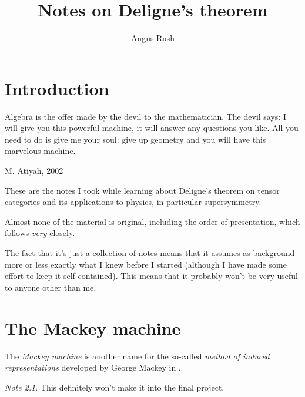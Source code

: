 \documentclass[a4paper,10pt]{scrreprt}
\title{Notes on Deligne's theorem}
\author{Angus Rush}
\theoremstyle{definition}
\theoremstyle{plain}
\theoremstyle{remark}
\newtheorem{note}{Note}[section]
\begin{document}
 
\maketitle
\tableofcontents 

\chapter{Introduction}
\epigraph{Algebra is the offer made by the devil to the mathematician. The devil says: I will give you this powerful machine, it will answer any questions you like. All you need to do is give me your soul: give up geometry and you will have this marvelous machine.}{M. Atiyah, 2002}

These are the notes I took while learning about Deligne's theorem on tensor categories and its applications to physics, in particular supersymmetry. 

Almost none of the material is original, including the order of presentation, which follows \cite{nlab-deligne-theorem} \emph{very} closely.

The fact that it's just a collection of notes means that it assumes as background more or less exactly what I knew before I started (although I have made some effort to keep it self-contained). This means that it probably won't be very useful to anyone other than me.

\chapter{The Mackey machine}
The \emph{Mackey machine} is another name for the so-called \emph{method of induced representations} developed by George Mackey in \cite{mackey-induced-representations}. 

\begin{note}
  This definitely won't make it into the final project.
\end{note}
\end{document}
